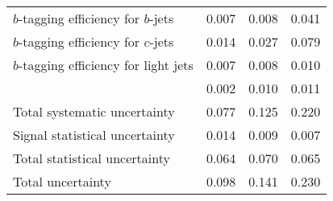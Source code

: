 \begin{table}[htb]
\begin{center}
\begin{tabular}{l c c c}
    $b$-tagging efficiency for $b$-jets  	   &	0.007	&	0.008	&	0.041	\\
    $b$-tagging efficiency for $c$-jets        &	0.014	&	0.027	&	0.079	\\
    $b$-tagging efficiency for light jets      &	0.007	&	0.008	&	0.010	\\
    \MET	                                   &	0.002	&	0.010	&	0.011	\\
    \midrule
    Total systematic uncertainty        	   &	0.077	&	0.125	&	0.220	\\
    \midrule
    Signal statistical uncertainty	           &	0.014	&	0.009	&	0.007	\\
    \midrule
    Total statistical uncertainty	           &	0.064	&	0.070	&	0.065	\\
    \midrule \midrule
    Total uncertainty           	           &	0.098	&	0.141	&	0.230	\\
    \bottomrule \bottomrule
  \end{tabular}
  \end{center}
  \label{tqX:rankingbreakuX}
  \end{table}

